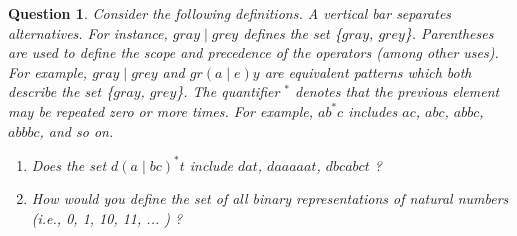 \documentclass[13pt,a4paper]{article}
\newtheorem{question}{Question}
\begin{document}
\begin{question}
Consider the following definitions.  
A vertical bar separates alternatives. For instance, $gray  \mid grey$ defines the set \{$gray$, $grey$\}.
Parentheses are used to define the scope and precedence of the operators (among other uses). For example, $gray \mid grey$ and $gr(a\mid e)y$ are equivalent patterns which both describe the set 
 \{$gray$, $grey$\}.
The quantifier $^*$ denotes that the previous element may be repeated zero or more times. 
 For example, $ab^*c$ includes $ac$, $abc$, $abbc$, $abbbc$, and so on.
\begin{enumerate}
\item
Does the set $d (a \mid bc)^*t  $ include $dat$, $daaaaat$, $dbcabct$ ?  
\item
How would you define the set of all binary representations of natural numbers (i.e., 0, 1, 10, 11, ... ) ?
\end{enumerate}
\end{question}
\end{document}
